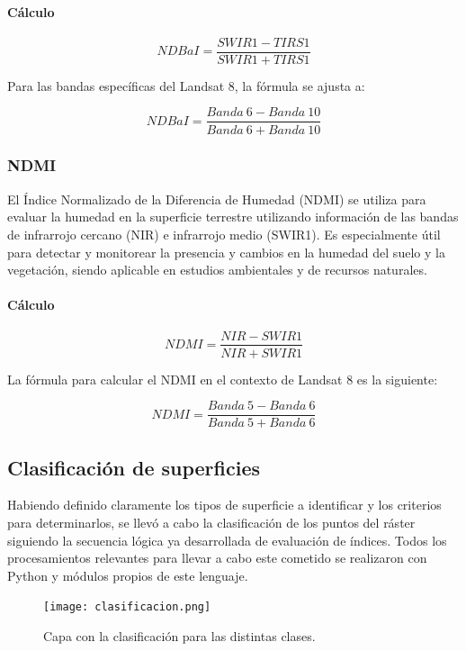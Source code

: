 \paragraph{Cálculo}

$$NDBaI=\frac{SWIR1-TIRS1}{SWIR1+TIRS1}$$

Para las bandas específicas del Landsat 8, la fórmula se ajusta a:

$$NDBaI=\frac{Banda~6-Banda~10}{Banda~6+Banda~10}$$

\subsubsection{NDMI}

El Índice Normalizado de la Diferencia de Humedad (NDMI) se utiliza para evaluar la humedad en la superficie terrestre utilizando información de las bandas de infrarrojo cercano (NIR) e infrarrojo medio (SWIR1). Es especialmente útil para detectar y monitorear la presencia y cambios en la humedad del suelo y la vegetación, siendo aplicable en estudios ambientales y de recursos naturales.

\paragraph{Cálculo}

$$NDMI=\frac{NIR-SWIR1}{NIR+SWIR1}$$

La fórmula para calcular el NDMI en el contexto de Landsat 8 es la siguiente:

$$NDMI=\frac{Banda~5-Banda~6}{Banda~5+Banda~6}$$

\subsection{Clasificación de superficies}

Habiendo definido claramente los tipos de superficie a identificar y los criterios para determinarlos, se llevó a cabo la clasificación de los puntos del ráster siguiendo la secuencia lógica ya desarrollada de evaluación de índices. Todos los procesamientos relevantes para llevar a cabo este cometido se realizaron con Python y módulos propios de este lenguaje.

\begin{figure}[H]
	\texttt{[image: clasificacion.png]}
	\centering
	\caption{Capa con la clasificación para las distintas clases.}
	\label{fig:clasificacion}
\end{figure}

